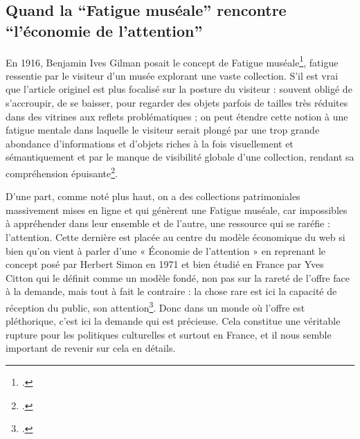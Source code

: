 \subsection{Quand la \enquote{Fatigue muséale} rencontre \enquote{l'économie de l'attention}}

En 1916, Benjamin Ives Gilman posait le concept de Fatigue muséale\footcite{gilman_museum_1916}, fatigue ressentie par le visiteur d’un musée explorant une vaste collection. S’il est vrai que l’article originel est plus focalisé sur la posture du visiteur : souvent obligé de s’accroupir, de se baisser, pour regarder des objets parfois de tailles très réduites dans des vitrines aux reflets problématiques ; on peut étendre cette notion à une fatigue mentale dans laquelle le visiteur serait plongé par une trop grande abondance d’informations et d’objets riches à la fois visuellement et sémantiquement et par le manque de visibilité globale d’une collection, rendant sa compréhension épuisante\footcite[pp. 1-2]{windhager2018a}. 

D’une part, comme noté plus haut, on a des collections patrimoniales massivement mises en ligne et qui génèrent une Fatigue muséale, car impossibles à appréhender dans leur ensemble et de l’autre, une ressource qui se raréfie : l’attention. Cette dernière est placée au centre du modèle économique du web si bien qu’on vient à parler d’une « Économie de l’attention » en reprenant le concept posé par Herbert Simon en 1971 et bien étudié en France par Yves Citton qui le définit comme un modèle fondé, non pas sur la rareté de l’offre face à la demande, mais tout à fait le contraire : la chose rare est ici la capacité de réception du public, son attention\footcite[Citton Yves, \enquote{pour une écologie de l’attention}, Paris, Seuil, 2014, p. 16 \textit{in}]{durand2016}. Donc dans un monde où l’offre est pléthorique, c’est ici la demande qui est précieuse. Cela constitue une véritable rupture pour les politiques culturelles et surtout en France, et il nous semble important de revenir sur cela en détails.  

